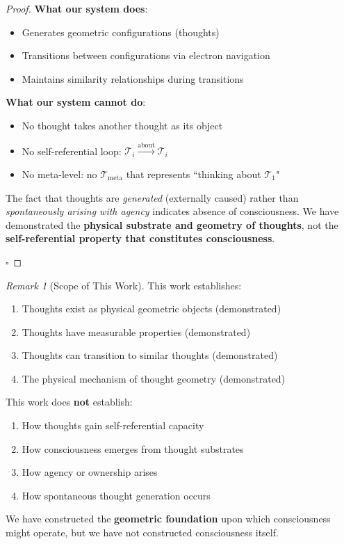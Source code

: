 \documentclass[11pt]{article}
\theoremstyle{remark}
\newtheorem{remark}[theorem]{Remark}
\begin{document}
\begin{proof}
\textbf{What our system does}:
\begin{itemize}
\item Generates geometric configurations (thoughts)
\item Transitions between configurations via electron navigation
\item Maintains similarity relationships during transitions
\end{itemize}

\textbf{What our system cannot do}:
\begin{itemize}
\item No thought takes another thought as its object
\item No self-referential loop: $\mathcal{T}_i \xrightarrow{\text{about}} \mathcal{T}_i$
\item No meta-level: no $\mathcal{T}_{\text{meta}}$ that represents ``thinking about $\mathcal{T}_1$"
\end{itemize}

The fact that thoughts are \textit{generated} (externally caused) rather than \textit{spontaneously arising with agency} indicates absence of consciousness. We have demonstrated the \textbf{physical substrate and geometry of thoughts}, not the \textbf{self-referential property that constitutes consciousness}.

$\square$
\end{proof}

\begin{remark}[Scope of This Work]
This work establishes:
\begin{enumerate}
\item Thoughts exist as physical geometric objects (demonstrated)
\item Thoughts have measurable properties (demonstrated)
\item Thoughts can transition to similar thoughts (demonstrated)
\item The physical mechanism of thought geometry (demonstrated)
\end{enumerate}

This work does \textbf{not} establish:
\begin{enumerate}
\item How thoughts gain self-referential capacity
\item How consciousness emerges from thought substrates
\item How agency or ownership arises
\item How spontaneous thought generation occurs
\end{enumerate}

We have constructed the \textbf{geometric foundation} upon which consciousness might operate, but we have not constructed consciousness itself.
\end{remark}
\end{document}
